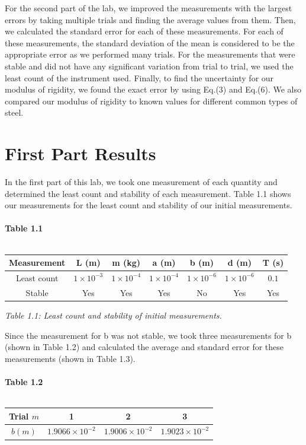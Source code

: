 \documentclass[leqno]{article}
\begin{document}
\noindent For the second part of the lab, we improved the measurements with the largest errors by taking multiple trials and finding the average values from them.  Then, we calculated the standard error for each of these measurements.  For each of these measurements, the standard deviation of the mean is considered to be the appropriate error as we performed many trials.  For the measurements that were stable and did not have any significant variation from trial to trial, we used the least count of the instrument used.  Finally, to find the uncertainty for our modulus of rigidity, we found the exact error by using Eq.(3) and Eq.(6).  We also compared our modulus of rigidity to known values for different common types of steel. 
\section*{First Part Results}
In the first part of this lab, we took one measurement of each quantity and determined the least count and stability of each measurement.  Table 1.1 shows our measurements for the least count and stability of our initial measurements.\\\\
\textbf{Table 1.1}\\\\
\begin{tabular}{|c|c|c|c|c|c|c|}
	\hline
	Measurement & L (m)& m (kg)& a (m)& b (m)& d (m)& T (s)\\
	\hline
	Least count & $1 \times 10^{-3}$ & $1\times 10^{-4}$ & $1 \times 10^{-4}$ & $1 \times 10^{-6}$ & $1 \times 10^{-6}$ & $0.1$\\
	\hline
	Stable & Yes & Yes & Yes & No & Yes & Yes\\
	\hline
\end{tabular}
\begin{flushleft}
\textit{\small Table 1.1: Least count and stability of initial measurements.}
\end{flushleft}
Since the measurement for b was not stable, we took three measurements for b (shown in Table 1.2) and calculated the average and standard error for these measurements (shown in Table 1.3).\\\\
\textbf{Table 1.2}\\\\
\begin{tabular}{|c|c|c|c|}
	\hline
	Trial $m$ & 1 & 2 & 3\\
	\hline
	$b (m)$ & $1.9066 \times 10^{-2}$ & $1.9006 \times 10^{-2}$ & $1.9023 \times 10^{-2}$\\
	\hline
\end{tabular}
\end{document}
